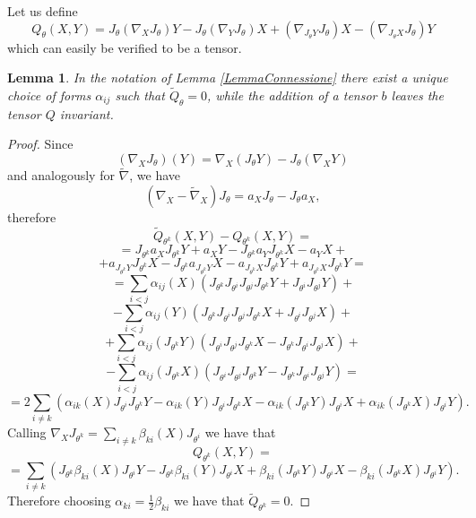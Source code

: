 \documentclass{article}
\newcommand{\alfa}{\alpha}
\newtheorem{lemma}[proposizione]{Lemma}
\theoremstyle{definition}
\theoremstyle{remark}
\begin{document}
Let us define
\begin{equation}\label{DefinizioneQ}
 Q_{\theta}(X,Y) = J_{\theta}(\nabla_XJ_{\theta})Y -J_{\theta}(\nabla_YJ_{\theta})X + (\nabla_{J_{\theta}Y}J_{\theta})X - (\nabla_{J_{\theta}X}J_{\theta})Y
\end{equation}
which can easily be verified to be a tensor.

\begin{lemma}\label{LemmaTensoreQ}
 In the notation of Lemma \ref{LemmaConnessione} there exist a unique choice of forms $\alfa_{ij}$ such that $\widetilde{Q}_{\theta}=0$, while the addition of a tensor $b$ leaves the tensor $Q$ invariant.
\end{lemma}

\begin{proof}
 Since
 $$(\nabla_XJ_{\theta})(Y) = \nabla_X(J_{\theta}Y) - J_{\theta}(\nabla_XY)$$
 and analogously for $\widetilde{\nabla}$, we have
 \begin{equation}\label{DifferenzialeJ}
  (\nabla_X-\widetilde{\nabla}_X)J_{\theta} = a_XJ_{\theta} - J_{\theta}a_X,
 \end{equation}
 therefore
 $$\widetilde{Q}_{\theta^k}(X,Y) -Q_{\theta^k}(X,Y) =  $$
 $$ = J_{\theta^k}a_XJ_{\theta^k}Y +a_XY -J_{\theta^k}a_YJ_{\theta^k}X -a_YX +$$
 $$+ a_{J_{\theta^k}Y}J_{\theta^k}X -J_{\theta^k}a_{J_{\theta^k}Y}X - a_{J_{\theta^k}X}J_{\theta^k}Y + a_{J_{\theta^k}X}J_{\theta^k}Y=$$
 $$=\sum_{i<j}\alfa_{ij}(X)\left(J_{\theta^k}J_{\theta^i}J_{\theta^j}J_{\theta^k}Y + J_{\theta^i}J_{\theta^j}Y\right)+$$
 $$-\sum_{i<j}\alfa_{ij}(Y)\left(J_{\theta^k}J_{\theta^i}J_{\theta^j}J_{\theta^k}X + J_{\theta^i}J_{\theta^j}X\right)+$$
 $$+\sum_{i<j}\alfa_{ij}(J_{\theta^k}Y)\left(J_{\theta^i}J_{\theta^j}J_{\theta^k}X - J_{\theta^k}J_{\theta^i}J_{\theta^j}X \right) +$$
 $$-\sum_{i<j}\alfa_{ij}(J_{\theta^k}X)\left(J_{\theta^i}J_{\theta^j}J_{\theta^k}Y - J_{\theta^k}J_{\theta^i}J_{\theta^j}Y\right)=$$
 \begin{equation}\label{DifferenzaQ}
  =2\sum_{i\ne k}\left(\alfa_{ik}(X)J_{\theta^i}J_{\theta^k}Y-\alfa_{ik}(Y)J_{\theta^i}J_{\theta^k}X - \alfa_{ik}(J_{\theta^k}Y)J_{\theta^i}X + \alfa_{ik}(J_{\theta^k}X)J_{\theta^i}Y\right).
 \end{equation}
 Calling $\nabla_XJ_{\theta^k} = \sum_{i\ne k}\beta_{ki}(X)J_{\theta^i}$ we have that
 $$Q_{\theta^k}(X,Y) =$$
 $$= \sum_{i\ne k}\left( J_{\theta^k}\beta_{ki}(X)J_{\theta^i}Y -J_{\theta^k}\beta_{ki}(Y)J_{\theta^i}X + \beta_{ki}(J_{\theta^k}Y)J_{\theta^i}X - \beta_{ki}(J_{\theta^k}X)J_{\theta^i}Y \right).$$
 Therefore choosing $\alfa_{ki}=\frac{1}{2}\beta_{ki}$ we have that $\widetilde{Q}_{\theta^k}=0$.
 

\end{proof}
\end{document}

